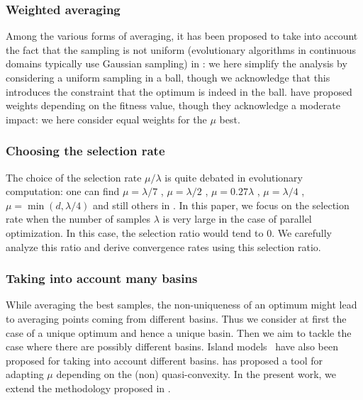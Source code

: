 \subsubsection{Weighted averaging}
Among the various forms of averaging,
it has been proposed to take into account the fact that the sampling is not uniform (evolutionary algorithms in continuous domains typically use Gaussian sampling) in \cite{sumo}: we here simplify the analysis by considering a uniform sampling in a ball, though we acknowledge that this introduces the constraint that the optimum is indeed in the ball. \cite{arnoldweights,anneweights} have proposed weights depending on the fitness value, though they acknowledge a moderate impact: we here consider equal weights for the $\mu$ best.

\subsubsection{Choosing the selection rate}
The choice of the selection rate $\mu/\lambda$ is quite debated in evolutionary computation: one can find $\mu=\lambda/7$ \cite{amorales}, $\mu=\lambda/2$ \cite{cmsa}, $\mu=0.27\lambda$ \cite{escompr}, $\mu=\lambda/4$ \cite{HAN}, $\mu=\min(d,\lambda/4)$ \cite{chooselambda,fournierAlgorithmica} and still others in \cite{beyerbenefitofsex,jeb}. In this paper, we focus on the selection rate when the number of samples $\lambda$ is very large in the case of parallel optimization. In this case, the selection ratio would tend to $0$. We carefully analyze this ratio and derive convergence rates using this selection ratio.

\subsubsection{Taking into account many basins} While averaging the best samples, the non-uniqueness of an optimum might lead to averaging points coming from different basins. Thus we consider at first the case of a unique optimum and hence a unique basin. Then we aim to tackle the case where there are possibly different basins. Island models~\cite{islands} have also been proposed for taking into account different basins. \cite{ppsnkbest} has proposed a tool for adapting $\mu$ depending on the (non) quasi-convexity. In the present work, we extend the methodology proposed in \cite{ppsnkbest}.

